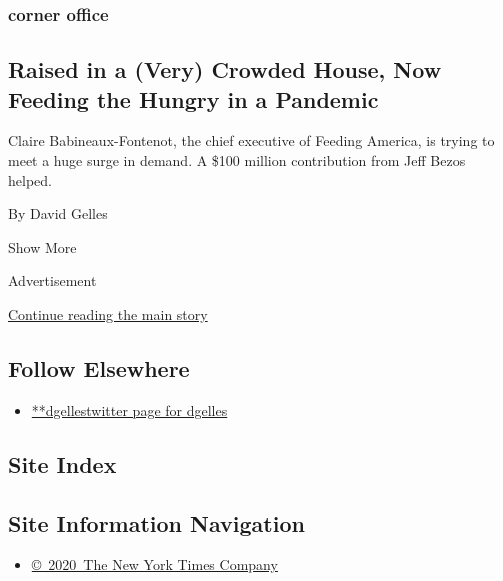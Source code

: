 \begin{enumerate}
{  \subsubsection{corner office}\label{corner-office-3}}

  \hypertarget{raised-in-a-very-crowded-house-now-feeding-the-hungry-in-a-pandemic}{%
  \subsection{Raised in a (Very) Crowded House, Now Feeding the Hungry
  in a
  Pandemic}\label{raised-in-a-very-crowded-house-now-feeding-the-hungry-in-a-pandemic}}

  Claire Babineaux-Fontenot, the chief executive of Feeding America, is
  trying to meet a huge surge in demand. A \$100 million contribution
  from Jeff Bezos helped.

  By David Gelles
\end{enumerate}

Show More

Advertisement

\protect\hyperlink{after-mid2}{Continue reading the main story}

\hypertarget{follow-elsewhere}{%
\subsection{Follow Elsewhere}\label{follow-elsewhere}}

\begin{itemize}
\tightlist
\item
  \href{https://twitter.com/dgelles}{**dgellestwitter page for dgelles}
\end{itemize}

\hypertarget{site-index}{%
\subsection{Site Index}\label{site-index}}

\hypertarget{site-information-navigation}{%
\subsection{Site Information
Navigation}\label{site-information-navigation}}

\begin{itemize}
\tightlist
\item
  \href{https://help.nytimes3xbfgragh.onion/hc/en-us/articles/115014792127-Copyright-notice}{©~2020~The
  New York Times Company}
\end{itemize}

